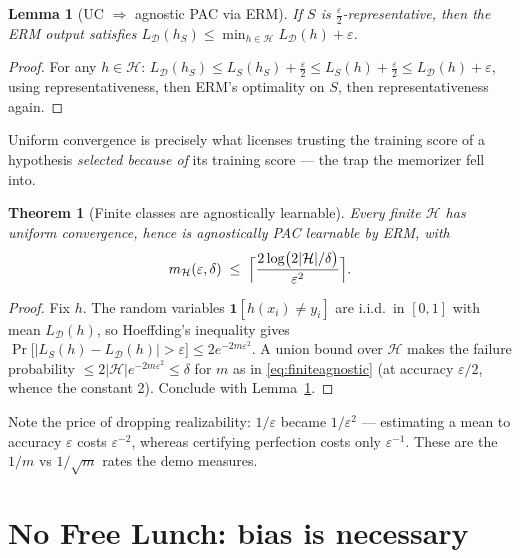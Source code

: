 \documentclass[11pt]{article}
\newtheorem{theorem}{Theorem}
\newtheorem{lemma}{Lemma}
\newcommand{\D}{\mathcal{D}}
\newcommand{\Hyp}{\mathcal{H}}
\newcommand{\err}{L_{\D}}
\newcommand{\emperr}{L_{S}}
\begin{document}
\begin{lemma}[UC $\Rightarrow$ agnostic PAC via ERM]
\label{lem:ucerm}
If $S$ is $\tfrac{\varepsilon}{2}$-representative, then the ERM output
satisfies $\err(h_S) \le \min_{h\in\Hyp} \err(h) + \varepsilon$.
\end{lemma}

\begin{proof}
For any $h\in\Hyp$:
$\err(h_S) \le \emperr(h_S) + \tfrac{\varepsilon}{2}
\le \emperr(h) + \tfrac{\varepsilon}{2}
\le \err(h) + \varepsilon$,
using representativeness, then ERM's optimality on $S$, then
representativeness again.
\end{proof}

Uniform convergence is precisely what licenses trusting the training
score of a hypothesis \emph{selected because of} its training score ---
the trap the memorizer fell into.

\begin{theorem}[Finite classes are agnostically learnable]
\label{thm:finiteagnostic}
Every finite $\Hyp$ has uniform convergence, hence is agnostically PAC
learnable by ERM, with
\begin{equation}
  m_{\Hyp}(\varepsilon,\delta)
  \;\le\;
  \Bigl\lceil \frac{2\log\bigl(2|\Hyp|/\delta\bigr)}{\varepsilon^{2}}
  \Bigr\rceil .
  \label{eq:finiteagnostic}
\end{equation}
\end{theorem}

\begin{proof}
Fix $h$. The random variables $\mathbf{1}[h(x_i)\ne y_i]$ are i.i.d.\ in
$[0,1]$ with mean $\err(h)$, so Hoeffding's inequality gives
$\Pr\bigl[|\emperr(h)-\err(h)| > \varepsilon\bigr] \le
2e^{-2m\varepsilon^2}$. A union bound over $\Hyp$ makes the failure
probability $\le 2|\Hyp| e^{-2m\varepsilon^2} \le \delta$ for $m$ as in
\eqref{eq:finiteagnostic} (at accuracy $\varepsilon/2$, whence the
constant 2). Conclude with Lemma~\ref{lem:ucerm}.
\end{proof}

Note the price of dropping realizability: $1/\varepsilon$ became
$1/\varepsilon^{2}$ --- estimating a mean to accuracy $\varepsilon$ costs
$\varepsilon^{-2}$, whereas certifying perfection costs only
$\varepsilon^{-1}$. These are the $1/m$ vs $1/\sqrt m$ rates the demo
measures.

\section{No Free Lunch: bias is necessary}
\end{document}
